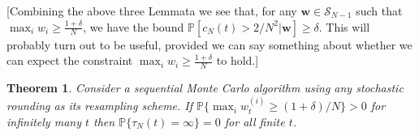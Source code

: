 \documentclass{article}
\newtheorem{thm}{Theorem}
\newcommand{\PR}{\mathbb{P}}
\begin{document}
[Combining the above three Lemmata we see that, for any $\mathbf{w} \in \mathcal{S}_{N-1}$ such that $\max_i w_i \geq \frac{1 + \delta}{N}$, we have the bound $\PR[ c_N(t) > 2/N^2 | \mathbf{w} ] \geq \delta$. This will probably turn out to be useful, provided we can say something about whether we can expect the constraint $\max_i w_i \geq \frac{1 + \delta}{N}$ to hold.]

\begin{thm}
Consider a sequential Monte Carlo algorithm using any stochastic rounding as its resampling scheme.
If $\PR\{\max_i w_t^{(i)} \geq (1+\delta)/N\} >0$ for infinitely many $t$ then $\PR\{\tau_N(t) = \infty \}=0$ for all finite $t$.
\end{thm}
\end{document}

